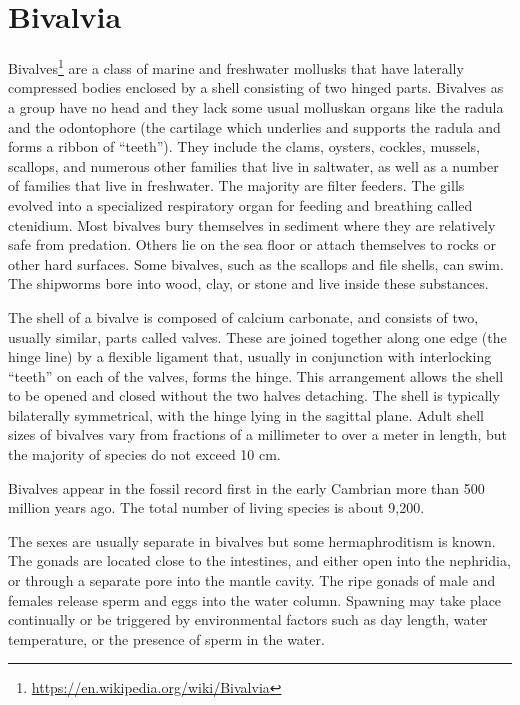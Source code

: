\documentclass[]{book}
\let\rmarkdownfootnote\footnote%
\def\footnote{\protect\rmarkdownfootnote}
\renewcommand{\href}[2]{#2\footnote{\url{#1}}}
\begin{document}
\hypertarget{bivalvia}{%
\section{Bivalvia}\label{bivalvia}}

\href{https://en.wikipedia.org/wiki/Bivalvia}{Bivalves} are a class of marine and freshwater mollusks that have laterally compressed bodies enclosed by a shell consisting of two hinged parts. Bivalves as a group have no head and they lack some usual molluskan organs like the radula and the odontophore (the cartilage which underlies and supports the radula and forms a ribbon of ``teeth''). They include the clams, oysters, cockles, mussels, scallops, and numerous other families that live in saltwater, as well as a number of families that live in freshwater. The majority are filter feeders. The gills evolved into a specialized respiratory organ for feeding and breathing called ctenidium. Most bivalves bury themselves in sediment where they are relatively safe from predation. Others lie on the sea floor or attach themselves to rocks or other hard surfaces. Some bivalves, such as the scallops and file shells, can swim. The shipworms bore into wood, clay, or stone and live inside these substances.

The shell of a bivalve is composed of calcium carbonate, and consists of two, usually similar, parts called valves. These are joined together along one edge (the hinge line) by a flexible ligament that, usually in conjunction with interlocking ``teeth'' on each of the valves, forms the hinge. This arrangement allows the shell to be opened and closed without the two halves detaching. The shell is typically bilaterally symmetrical, with the hinge lying in the sagittal plane. Adult shell sizes of bivalves vary from fractions of a millimeter to over a meter in length, but the majority of species do not exceed 10 cm.

Bivalves appear in the fossil record first in the early Cambrian more than 500 million years ago. The total number of living species is about 9,200.

The sexes are usually separate in bivalves but some hermaphroditism is known. The gonads are located close to the intestines, and either open into the nephridia, or through a separate pore into the mantle cavity. The ripe gonads of male and females release sperm and eggs into the water column. Spawning may take place continually or be triggered by environmental factors such as day length, water temperature, or the presence of sperm in the water.
\end{document}
